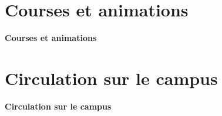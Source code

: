 \documentclass{beamer}
\begin{document}
\begin{frame}
\end{frame}


\section{Courses et animations}

\begin{frame}

\centering\Huge{\textbf{Courses et animations}}

\end{frame}

\begin{frame}
\end{frame}


\section{Circulation sur le campus}

\begin{frame}

\centering\Huge{\textbf{Circulation sur le campus}}

\end{frame}

\begin{frame}
\end{frame}
\end{document}
